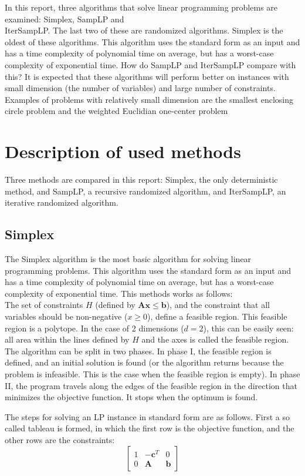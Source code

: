 \documentclass[nocopyrightspace]{acm_proc_article-sp}
\begin{document}
In this report, three algorithms that solve linear programming problems are examined: Simplex, SampLP and  \\ IterSampLP. The last two of these are randomized algorithms. Simplex is the oldest of these algorithms. This algorithm uses the standard form as an input and has a time complexity of polynomial time on average, but has a worst-case complexity of exponential time. How do SampLP and IterSampLP compare with this? It is expected that these algorithms will perform better on instances with small dimension (the number of variables) and large number of constraints. Examples of problems with relatively small dimension are the smallest enclosing circle problem and the weighted Euclidian one-center problem

\section{Description of used methods}
Three methods are compared  in this report: Simplex, the only deterministic method, and SampLP, a recursive randomized algorithm, and IterSampLP, an iterative randomized algorithm.
\subsection{Simplex}
The Simplex algorithm \cite{dantzig1951maximization} is the most basic algorithm for solving linear programming problems. This algorithm uses the standard form as an input and has a time complexity of polynomial time on average, but has a worst-case complexity of exponential time. This methods works as follows: \\
The set of constraints $H$ (defined by $\mathbf{Ax} \leq \mathbf{b}$), and the constraint that all variables should be non-negative ($x \geq 0$), define a feasible region. This feasible region is a polytope. In the case of 2 dimensions ($d=2$), this can be easily seen: all area within the lines defined by $H$ and the axes is called the feasible region. \\
The algorithm can be split in two phases. In phase I, the feasible region is defined, and an initial solution is found (or the algorithm returns because the problem is infeasible. This is the case when the feasible region is empty). In phase II, the program travels along the edges of the feasible region in the direction that minimizes the objective function. It stops when the optimum is found.

The steps for solving an LP instance in standard form are as follows. First a so called tableau is formed, in which the first row is the objective function, and the other rows are the constraints:
\[
\begin{bmatrix}
1 & -\mathbf{c}^T & 0 \\
0 & \mathbf{A} & \mathbf{b}
\end{bmatrix} \]
\end{document}
